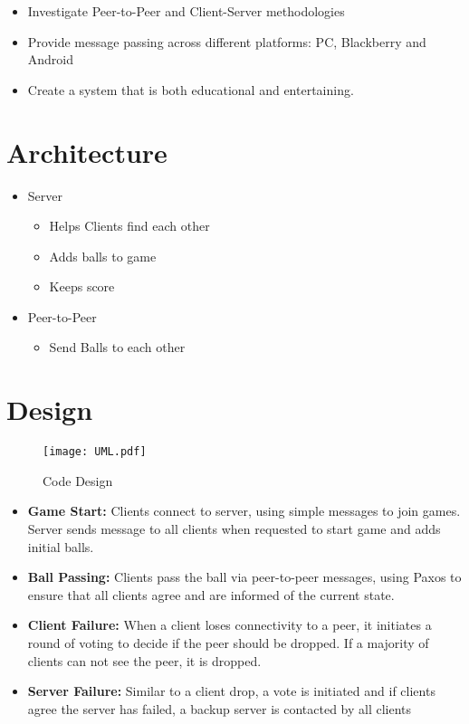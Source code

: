\documentclass{sig-alternate}
\begin{document}
\begin{itemize}
	\item Investigate Peer-to-Peer and Client-Server methodologies
	\item Provide message passing across different platforms: PC,
		Blackberry and Android
	\item Create a system that is both educational and entertaining.
\end{itemize}

\section{Architecture}
\label{architecture}

\begin{itemize}
	\item Server
		\begin{itemize}
			\item Helps Clients find each other
			\item Adds balls to game
			\item Keeps score
		\end{itemize}
	\item Peer-to-Peer
		\begin{itemize}
			\item Send Balls to each other
		\end{itemize}
\end{itemize}

\section{Design}
\label{design}

\begin{figure}[htb]
	\label{code design}
	\begin{center}
		\texttt{[image: UML.pdf]}
		\caption{Code Design}
	\end{center}
\end{figure}

\begin{itemize}
	\item \textbf{Game Start:} Clients connect to server, using simple
		messages to join games.  Server sends message to all clients when
		requested to start game and adds initial balls.
	\item \textbf{Ball Passing:} Clients pass the ball via peer-to-peer
		messages, using Paxos to ensure that all clients agree and are
		informed of the current state.
	\item \textbf{Client Failure:} When a client loses connectivity to a
		peer, it initiates a round of voting to decide if the peer should
		be dropped.  If a majority of clients can not see the peer, it is
		dropped.
	\item \textbf{Server Failure:} Similar to a client drop, a vote is
		initiated and if clients agree the server has failed, a backup
		server is contacted by all clients
\end{itemize}
\end{document}
